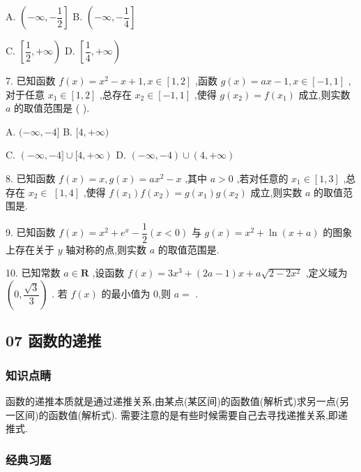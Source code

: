 A. $\left( {-\infty , - \dfrac{1}{2}}\right\rbrack$ B. $\left( {-\infty , - \dfrac{1}{4}}\right\rbrack$

C. $\left\lbrack  {\dfrac{1}{2}, + \infty }\right)$ D. $\left\lbrack  {\dfrac{1}{4}, + \infty }\right)$

7. 已知函数 $f\left( x\right)  = {x}^{2} - x + 1,x \in  \left\lbrack  {1,2}\right\rbrack$ ,函数 $g\left( x\right)  = {ax} - 1,x \in  \left\lbrack  {-1,1}\right\rbrack$ ,对于任意 ${x}_{1} \in  \left\lbrack  {1,2}\right\rbrack$ ,总存在 ${x}_{2} \in  \left\lbrack  {-1,1}\right\rbrack$ ,使得 $g\left( {x}_{2}\right)  = f\left( {x}_{1}\right)$ 成立,则实数 $a$ 的取值范围是 (   ).

A. $( - \infty , - 4\rbrack$ B. $\lbrack 4, + \infty )$

C. $\left( {-\infty , - 4\rbrack \cup \lbrack 4, + \infty }\right)$ D. $\left( {-\infty , - 4}\right)  \cup  \left( {4, + \infty }\right)$

8. 已知函数 $f\left( x\right)  = x,g\left( x\right)  = a{x}^{2} - x$ ,其中 $a > 0$ ,若对任意的 ${x}_{1} \in  \left\lbrack  {1,3}\right\rbrack$ ,总存在 ${x}_{2} \in$  $\left\lbrack  {1,4}\right\rbrack$ ,使得 $f\left( {x}_{1}\right) f\left( {x}_{2}\right)  = g\left( {x}_{1}\right) g\left( {x}_{2}\right)$ 成立,则实数 $a$ 的取值范围是\blkda{}.

9. 已知函数 $f\left( x\right)  = {x}^{2} + {{e}}^{x} - \dfrac{1}{2}\left( {x < 0}\right)$ 与 $g\left( x\right)  = {x}^{2} + \ln \left( {x + a}\right)$ 的图象上存在关于 $y$ 轴对称的点,则实数 $a$ 的取值范围是\blkda{}.

10. 已知常数 $a \in  \mathbf{R}$ ,设函数 $f\left( x\right)  = 3{x}^{3} + \left( {{2a} - 1}\right) x + a\sqrt{2 - 2{x}^{2}}$ ,定义域为 $\left( {0,\dfrac{\sqrt{3}}{3}}\right)$ . 若 $f\left( x\right)$ 的最小值为 0,则 $a =$ \blkda{}.

\subsection*{07 函数的递推}

\subsubsection*{知识点睛}

函数的递推本质就是通过递推关系,由某点(某区间)的函数值(解析式)求另一点(另一区间)的函数值(解析式). 需要注意的是有些时候需要自己去寻找递推关系,即递推式.

\subsubsection*{经典习题}

